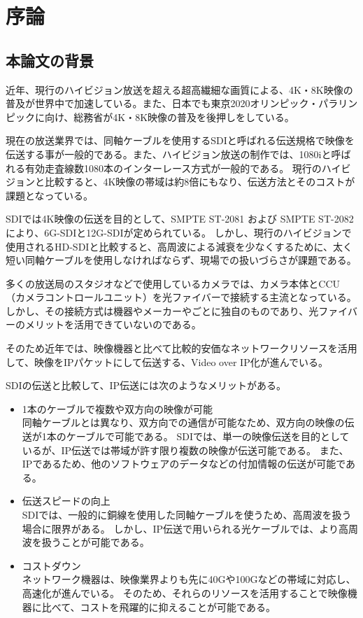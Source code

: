 \chapter{序論}
\label{chap:introduction}

\section{本論文の背景}
近年、現行のハイビジョン放送を超える超高繊細な画質による、4K・8K映像の普及が世界中で加速している。また、日本でも東京2020オリンピック・パラリンピックに向け、総務省が4K・8K映像の普及を後押しをしている。

現在の放送業界では、同軸ケーブルを使用するSDIと呼ばれる伝送規格で映像を伝送する事が一般的である。また、ハイビジョン放送の制作では、1080iと呼ばれる有効走査線数1080本のインターレース方式が一般的である。
現行のハイビジョンと比較すると、4K映像の帯域は約8倍にもなり、伝送方法とそのコストが課題となっている。

SDIでは4K映像の伝送を目的として、SMPTE ST-2081 および SMPTE ST-2082により、6G-SDIと12G-SDIが定められている。
しかし、現行のハイビジョンで使用されるHD-SDIと比較すると、高周波による減衰を少なくするために、太く短い同軸ケーブルを使用しなければならず、現場での扱いづらさが課題である。

多くの放送局のスタジオなどで使用しているカメラでは、カメラ本体とCCU（カメラコントロールユニット）を光ファイバーで接続する主流となっている。
しかし、その接続方式は機器やメーカーやごとに独自のものであり、光ファイバーのメリットを活用できていないのである。

そのため近年では、映像機器と比べて比較的安価なネットワークリソースを活用して、映像をIPパケットにして伝送する、Video over IP化が進んでいる。

SDIの伝送と比較して、IP伝送には次のようなメリットがある\cite{kodera-interbee2015}。
\begin{itemize}
  \item 1本のケーブルで複数や双方向の映像が可能\mbox{}\\
    同軸ケーブルとは異なり、双方向での通信が可能なため、双方向の映像の伝送が1本のケーブルで可能である。
    SDIでは、単一の映像伝送を目的としているが、IP伝送では帯域が許す限り複数の映像が伝送可能である。
    また、IPであるため、他のソフトウェアのデータなどの付加情報の伝送が可能である。
  \item 伝送スピードの向上\mbox{}\\
    SDIでは、一般的に銅線を使用した同軸ケーブルを使うため、高周波を扱う場合に限界がある。
    しかし、IP伝送で用いられる光ケーブルでは、より高周波を扱うことが可能である。
  \item コストダウン\mbox{}\\
    ネットワーク機器は、映像業界よりも先に40Gや100Gなどの帯域に対応し、高速化が進んでいる。
    そのため、それらのリソースを活用することで映像機器に比べて、コストを飛躍的に抑えることが可能である。
\end{itemize}

